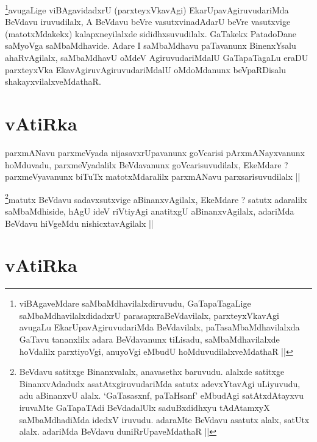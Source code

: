 
\begin{artha}
\footnote{viBAgaveMdare saMbaMdhavilalxdiruvudu, GaTapaTagaLige saMbaMdhavilalxdidadxrU parasapxraBeVdavilalx, parxteyxVkavAgi avugaLu EkarUpavAgiruvudariMda BeVdavilalx, paTasaMbaMdhavilalxda GaTavu tananxlilx adara BeVdavanunx tiLisadu, saMbaMdhavilalxde hoVdalilx parxtiyoVgi, anuyoVgi eMbudU hoMduvudilalxveMdathaR ||}avugaLige viBAgavidadxrU (parxteyxVkavAgi) EkarUpavAgiruvudariMda BeVdavu iruvudilalx, A BeVdavu beVre vasutxvinadAdarU beVre vasutxvige (matotxMdakekx) kalapxneyilalxde sididhxsuvudilalx. GaTakekx PatadoDane saMyoVga saMbaMdhavide. Adare I saMbaMdhavu paTavanunx BinenxYsalu ahaRvAgilalx, saMbaMdhavU oMdeV AgiruvudariMdalU GaTapaTagaLu eraDU parxteyxVka EkavAgiruvAgiruvudariMdalU oMdoMdanunx beVpaRDisalu shakayxvilalxveMdathaR. 
\end{artha}

\section*{vAtiRka}

\begin{artha}
parxmANavu parxmeVyada nijasavxrUpavanunx goVcarisi pArxmANayxvanunx hoMduvadu, parxmeVyadalilx BeVdavanunx goVcarisuvudilalx, EkeMdare ? parxmeVyavanunx biTuTx matotxMdaralilx parxmANavu parxsarisuvudilalx ||
\end{artha}

\begin{artha}
\footnote{BeVdavu satitxge Binanxvalalx, anavasethx baruvudu. alalxde satitxge BinanxvAdadudx asatAtxgiruvudariMda satutx adevxYtavAgi uLiyuvudu, adu aBinanxvU alalx. `GaTasasxnf, paTaHsanf' eMbudAgi satAtxdAtayxvu iruvaMte GaTapaTAdi BeVdadalUlx saduBxdidhxyu tAdAtamxyX saMbaMdhadiMda idedxV iruvudu. adaraMte BeVdavu asatutx alalx, satUtx alalx. adariMda BeVdavu duniRrUpaveMdathaR ||}matutx BeVdavu sadavxsutxvige aBinanxvAgilalx, EkeMdare ? satutx adaralilx saMbaMdhiside, hAgU ideV riVtiyAgi anatitxgU aBinanxvAgilalx, adariMda BeVdavu hiVgeMdu nishicxtavAgilalx ||
\end{artha}

\section*{vAtiRka}


